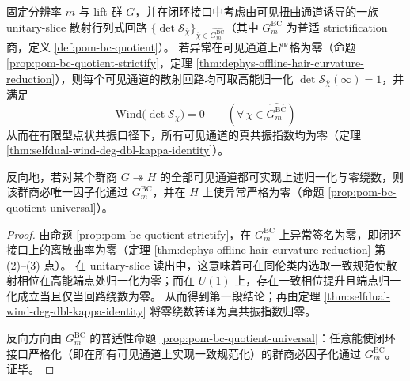 \begin{theorem}\label{thm:xi-anom-winding-obstruction}
固定分辨率 \(m\) 与 lift 群 \(G\)，并在闭环接口中考虑由可见扭曲通道诱导的一族 unitary-slice 散射行列式回路 \(\{\det\mathcal S_{\overline\chi}\}_{\overline\chi\in\widehat{G^{\mathrm{BC}}_m}}\)（其中 \(G^{\mathrm{BC}}_m\) 为普适 strictification 商，定义 \ref{def:pom-bc-quotient}）。
若异常在可见通道上严格为零（命题 \ref{prop:pom-bc-quotient-strictify}，定理 \ref{thm:dephys-offline-hair-curvature-reduction}），则每个可见通道的散射回路均可取高能归一化 \(\det\mathcal S_{\overline\chi}(\infty)=1\)，并满足
\[
\boxed{\;
\mathrm{Wind}\bigl(\det\mathcal S_{\overline\chi}\bigr)=0\qquad(\forall\,\overline\chi\in\widehat{G^{\mathrm{BC}}_m})\;}
\]
从而在有限型点状共振口径下，所有可见通道的真共振指数均为零（定理 \ref{thm:selfdual-wind-deg-dbl-kappa-identity}）。
\par
反向地，若对某个群商 \(G\twoheadrightarrow H\) 的全部可见通道都可实现上述归一化与零绕数，则该群商必唯一因子化通过 \(G^{\mathrm{BC}}_m\)，并在 \(H\) 上使异常严格为零（命题 \ref{prop:pom-bc-quotient-universal}）。
\end{theorem}

\begin{proof}
由命题 \ref{prop:pom-bc-quotient-strictify}，在 \(G^{\mathrm{BC}}_m\) 上异常签名为零，即闭环接口上的离散曲率为零（定理 \ref{thm:dephys-offline-hair-curvature-reduction} 第 (2)–(3) 点）。
在 unitary-slice 读出中，这意味着可在同伦类内选取一致规范使散射相位在高能端点处归一化为零；而在 \(U(1)\) 上，存在一致相位提升且端点归一化成立当且仅当回路绕数为零。
从而得到第一段结论；再由定理 \ref{thm:selfdual-wind-deg-dbl-kappa-identity} 将零绕数转译为真共振指数归零。
\par
反向方向由 \(G^{\mathrm{BC}}_m\) 的普适性命题 \ref{prop:pom-bc-quotient-universal}：任意能使闭环接口严格化（即在所有可见通道上实现一致规范化）的群商必因子化通过 \(G^{\mathrm{BC}}_m\)。证毕。
\end{proof}


